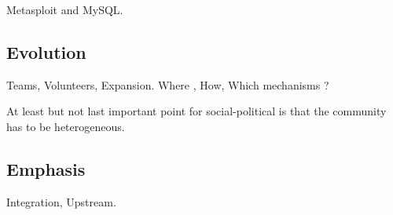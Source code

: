 \documentclass[11pt]{scrartcl}
\begin{document}
\par Metasploit and MySQL.


\subsection{Evolution}
\label{sub:evolution}

\par Teams, Volunteers, Expansion. Where , How, Which mechanisms ?

\par At least but not last important point for social-political is that the community has to be heterogeneous.


\subsection{Emphasis}
\label{sub:emphasis}

\par Integration, Upstream.


\end{document}
